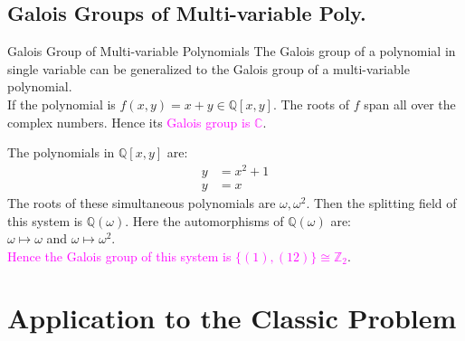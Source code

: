 \documentclass{beamer}
\begin{document}
\subsection{Galois Groups of Multi-variable Poly.}
\begin{frame}{Galois Group of Multi-variable Polynomials}
  The Galois group of a polynomial in single variable can be generalized to the Galois group of a multi-variable polynomial.\\[3mm]
If the polynomial is \textcolor{green!50!black}{\(f(x,y)=x+y \in \mathbb{Q}[x,y]\)}. The roots of \(f\) span all over the complex numbers. Hence its \textcolor{magenta}{Galois group is \(\mathbb{C}\)}.


\vspace{2mm}
 \begin{tcolorbox}[colback=white, colframe=brown!80!black, boxsep=1mm, title={\bfseries \color{white} Example}]
  The polynomials in \(\mathbb{Q}[x,y]\) are: \begin{align}
                         y &= x^2+1 \\
                         y&=x
                       \end{align}
                       The roots of these simultaneous polynomials are \(\omega, {\omega}^2\). Then the splitting field of this system is \(\mathbb{Q}(\omega)\). Here the automorphisms of \(\mathbb{Q}(\omega)\) are: \\
       \(\omega \longmapsto \omega\) and \hspace{9mm} \(\omega \longmapsto {\omega}^2\).\\
                       \textcolor{magenta}{Hence the Galois group of this system is \(\{(1), (12)\} \cong {\mathbb{Z}}_2\)}.
\end{tcolorbox}
\end{frame}

\section{Application to the Classic Problem}
\end{document}
